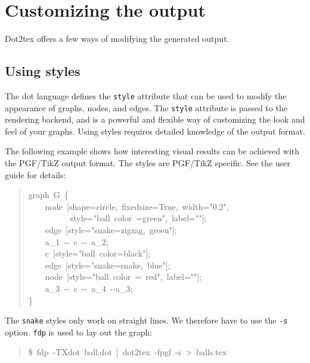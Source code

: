 \documentclass[10pt,a4paper,english]{article}
\begin{document}

\hypertarget{customizing-the-output}{}
\section*{Customizing the output}
\label{customizing-the-output}

Dot2tex offers a few ways of modifying the generated output.



\hypertarget{using-styles}{}
\subsection*{Using styles}
\label{using-styles}

The dot language defines the \texttt{style} attribute that can be used to modify the appearance of graphs, nodes, and edges. The \texttt{style} attribute is passed to the rendering backend, and is a powerful and flexible way of customizing the look and feel of your graphs. Using styles requires detailed knowledge of the output format.

The following example shows how interesting visual results can be achieved with the PGF/TikZ output format. The styles are PGF/TikZ specific. See the user guide for details:
\begin{quote}{\ttfamily \raggedright \noindent
graph~G~{\{}~\\
~~~~node~{[}shape=circle,~fixedsize=True,~width="0.2",~\\
~~~~~~~~~~style="ball~color~=green",~label="{}"{]};~\\
~~~~edge~{[}style="snake=zigzag,~green"{]};~\\
~~~~a{\_}1~-{}-~c~-{}-~a{\_}2;~\\
~~~~c~{[}style="ball~color=black"{]};~\\
~~~~edge~{[}style="snake=snake,~blue"{]};~\\
~~~~node~{[}style="ball~color~=~red",~label="{}"{]};~\\
~~~~a{\_}3~-{}-~c~-{}-~a{\_}4~-{}-a{\_}3;~\\
{\}}
}\end{quote}

The \texttt{snake} styles only work on straight lines. We therefore have to use the \texttt{-s} option. \texttt{fdp} is used to lay out the graph:
\begin{quote}{\ttfamily \raggedright \noindent
{\$}~fdp~-TXdot~ball.dot~|~dot2tex~-fpgf~-s~>~balls.tex
}\end{quote}
\end{document}
